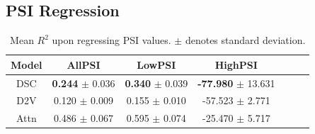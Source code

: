 



%


\subsection{PSI Regression} \label{subsubsec:psi_regression}

\begin{table}
	\centering
	\begin{tabular}{ c c c c c c c} 
		\hline
		
		Model & AllPSI &  LowPSI &  HighPSI \\
		\hline
		DSC	&	\textbf{0.244}   $\pm$	0.036	&	\textbf{0.340}	$\pm$	0.039	&	\textbf{-77.980}	$\pm$	13.631\\
		D2V	&	0.120	$\pm$	0.009	&	0.155	$\pm$	0.010	&	-57.523	$\pm$	2.771\\
		Attn	&	0.486	$\pm$	0.067	&	0.595	$\pm$	0.074	&	-25.470	$\pm$	5.717\\
	\end{tabular}
	\caption{Mean $R^2$ upon regressing PSI values.  $\pm$ denotes standard deviation. 
	}
	\label{table:psi_regression}
\end{table}

